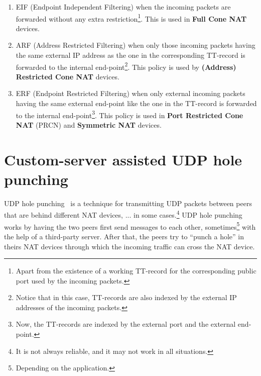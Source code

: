 \begin{enumerate}
\item EIF (Endpoint Independent Filtering) when the incoming packets
  are forwarded without any extra restriction\footnote{Apart from the
    existence of a working TT-record for the corresponding public port
    used by the incoming packets.}. This is used in \textbf{Full Cone
    NAT} devices.
\item ARF (Address Restricted Filtering) when only those incoming
  packets having the same external IP address as the one in the corresponding
  TT-record is forwarded to the internal end-point\footnote{Notice that
    in this case, TT-records are also indexed by the external IP
    addresses of the incoming packets.}. This policy is used by 
  \textbf{(Address) Restricted Cone NAT} devices.
\item ERF (Endpoint Restricted Filtering) when only external incoming
  packets having the same external end-point like the one in the
  TT-record is forwarded to the internal end-point\footnote{Now, the
    TT-records are indexed by the external port and the external
    end-point.}. This policy is used in \textbf{Port Restricted Cone
    NAT} (PRCN) and \textbf{Symmetric NAT} devices.
\end{enumerate}

\section{Custom-server assisted UDP hole punching}

UDP hole punching~\cite{srisuresh2008state} is a technique for
transmitting UDP packets between peers that are behind different NAT
devices, ... in some cases.\footnote{It is not always reliable, and it
  may not work in all situations.} UDP hole punching works by having
the two peers first send messages to each other, sometimes\footnote{Depending on the application.} with the
help of a third-party server. After that, the peers try to ``punch a
hole'' in theirs NAT devices through which the incoming traffic can
cross the NAT device.

